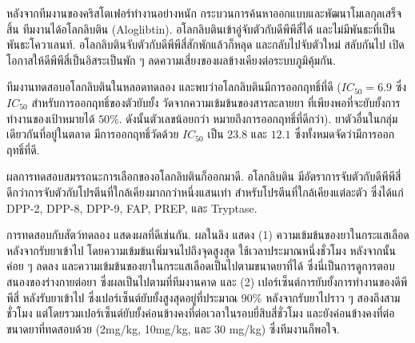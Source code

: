 {\begin{shaded}
หลังจากทีมงานของคริสโตเฟอร์ทำงานอย่างหนัก
กระบวนการค้นหาออกแบบและพัฒนาโมเลกุลเสร็จสิ้น
ทีมงานได้อโลกลิบติน (Aloglibtin).
อโลกลิบตินเข้าอู่จับตัวกับดีพีพีสี่ได้ และไม่มีพันธะที่เป็นพันธะโควาเลนท์.
อโลกลิบตินจับตัวกับดีพีพีสี่สักพักแล้วก็หลุด และกลับไปจับตัวใหม่ สลับกันไป เปิดโอกาสให้ดีพีพีสี่เป็นอิสระเป็นพัก ๆ
ลดความเสี่ยงของผลข้างเคียงต่อระบบภูมิคุ้มกัน.

ทีมงานทดสอบอโลกลิบตินในหลอดทดลอง 
และพบว่าอโลกลิบตินมีการออกฤทธิ์ที่ดี ($IC_{50} = 6.9$ ซึ่ง $IC_{50}$ สำหรับการออกฤทธิ์ของตัวยับยั้ง 
วัดจากความเข้มข้นของสารละลายยา %
ที่เพียงพอที่จะยับยั้งการทำงานของเป้าหมายได้ $50\%$. ดังนั้นตัวเลขน้อยกว่า หมายถึงการออกฤทธิ์ที่ดีกว่า).
ยาตัวอื่นในกลุ่มเดียวกันที่อยู่ในตลาด มีการออกฤทธิ์วัดด้วย $IC_{50}$ เป็น $23.8$ และ $12.1$ ซึ่งทั้งหมดจัดว่ามีการออกฤทธิ์ที่ดี.

ผลการทดสอบสมรรถนะการเลือกของอโลกลิบตินก็ออกมาดี.
อโลกลิบติน มีอัตราการจับตัวกับดีพีพีสี่ ดีกว่าการจับตัวกับโปรตีนที่ใกล้เคียงมากกว่าหนึ่งแสนเท่า 
สำหรับโปรตีนที่ใกล้เคียงแต่ละตัว ซึ่งได้แก่
DPP-2, DPP-8, DPP-9, FAP, PREP, และ Tryptase.

การทดสอบกับสัตว์ทดลอง
แสดงผลที่ดีเช่นกัน.
ผลในลิง
แสดง 
(1) ความเข้มข้นของยาในกระแสเลือดหลังจากรับยาเข้าไป โดยความเข้มข้นเพิ่มจนไปถึงจุดสูงสุด ใช้เวลาประมาณหนึ่งชั่วโมง หลังจากนั้นค่อย ๆ ลดลง และความเข้มข้นของยาในกระแสเลือดเป็นไปตามขนาดยาที่ได้
ซึ่งนี่เป็นการดูการตอบสนองของร่างกายต่อยา ซึ่งผลเป็นไปตามที่ทีมงานคาด
และ 
(2) เปอร์เซ็นต์การยับยั้งการทำงานของดีพีพีสี่ หลังรับยาเข้าไป ซึ่งเปอร์เซ็นต์ยับยั้งสูงสุดอยู่ที่ประมาณ $90$\% หลังจากรับยาไปราว ๆ สองถึงสามชั่วโมง แต่โดยรวมเปอร์เซ็นต์ยับยั้งค่อนข้างคงที่ต่อเวลาในรอบยี่สิบสี่ชั่วโมง และยังค่อนข้างคงที่ต่อขนาดยาที่ทดสอบด้วย (2mg/kg, 10mg/kg, และ 30 mg/kg)
ซึ่งทีมงานก็พอใจ.

%
%
%




\end{shaded}}
